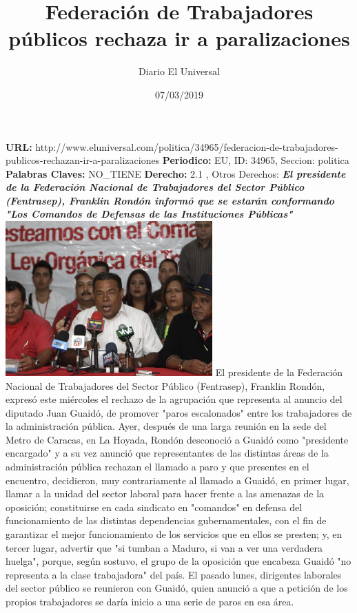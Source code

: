 \documentclass{article}%
\title{\textbf{Federación de Trabajadores públicos rechaza ir a paralizaciones}}%
\author{Diario El Universal}%
\date{07/03/2019}%
\begin{document}
%
\normalsize%
\maketitle%
\textbf{URL: }%
http://www.eluniversal.com/politica/34965/federacion{-}de{-}trabajadores{-}publicos{-}rechazan{-}ir{-}a{-}paralizaciones\newline%
%
\textbf{Periodico: }%
EU, %
ID: %
34965, %
Seccion: %
politica\newline%
%
\textbf{Palabras Claves: }%
NO\_TIENE\newline%
%
\textbf{Derecho: }%
2.1%
, Otros Derechos: %
\newline%
%
\textbf{\textit{El presidente de la Federación Nacional de Trabajadores del Sector Público (Fentrasep), Franklin Rondón informó que se estarán conformando "Los Comandos de Defensas de las Instituciones Públicas"}}%
\newline%
\newline%
%
\includegraphics[width=300px]{EU_34965.jpg}%
\newline%
%
El presidente de la Federación Nacional de Trabajadores del Sector Público (Fentrasep), Franklin Rondón, expresó este miércoles el rechazo de la agrupación que representa al anuncio del diputado Juan Guaidó, de promover "paros escalonados" entre los trabajadores de la administración pública.%
\newline%
%
Ayer, después de una larga reunión en la sede del Metro de Caracas, en La Hoyada, Rondón desconoció a Guaidó como "presidente encargado" y a su vez anunció que representantes de las distintas áreas de la administración pública rechazan el llamado a paro y que  presentes en el encuentro, decidieron, muy contrariamente al llamado a Guaidó, en primer lugar, llamar a la unidad del sector laboral para hacer frente a las amenazas de la oposición; constituirse en cada sindicato en "comandos" en defensa del funcionamiento de las distintas dependencias gubernamentales, con el fin de garantizar el mejor funcionamiento de los servicios que en ellos se presten; y, en tercer lugar, advertir que "si tumban a Maduro, si van a ver una verdadera huelga", porque, según sostuvo, el grupo de la oposición que encabeza Guaidó "no representa a la clase trabajadora" del país.%
\newline%
%
El pasado lunes, dirigentes laborales del sector público se reunieron con Guaidó, quien anunció a que a  petición de los propios trabajadores se daría inicio a una serie de paros en esa área.%
\newline%
%
\end{document}
